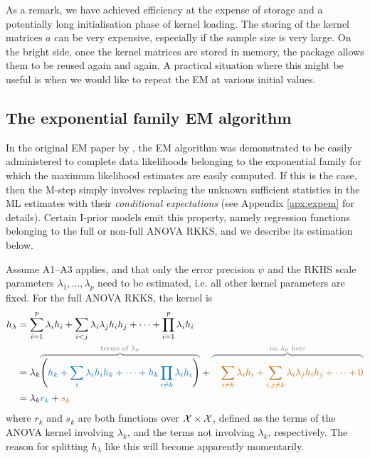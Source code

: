As a remark, we have achieved efficiency at the expense of storage and a potentially long initialisation phase of kernel loading.
The storing of the kernel matrices $a$ can be very expensive, especially if the sample size is very large.
On the bright side, once the kernel matrices are stored in memory, the  package allows them to be reused again and again.
A practical situation where this might be useful is when we would like to repeat the EM at various initial values.

\subsection{The exponential family EM algorithm}

In the original EM paper by \citet{dempster1977maximum}, the EM algorithm was demonstrated to be easily administered to complete data likelihoods belonging to the exponential family for which the maximum likelihood estimates are easily computed.
If this is the case, then the M-step simply involves replacing the unknown sufficient statistics in the ML estimates with their \emph{conditional expectations} (see Appendix \ref{apx:expem} for details).
Certain I-prior models emit this property, namely regression functions belonging to the full or non-full ANOVA RKKS, and we describe its estimation below.

Assume A1--A3 applies, and that only the error precision $\psi$ and the RKHS scale parameters $\lambda_1,\dots,\lambda_p$ need to be estimated, i.e. all other kernel parameters are fixed.
For the full ANOVA RKKS, the kernel is
\begin{align*}
  h_\lambda 
  &= \sum_{i=1}^p \lambda_i h_i + \sum_{i<j} \lambda_i \lambda_j h_i h_j + \cdots + \prod_{i=1}^p \lambda_i h_i \\
  &= \lambda_k 
  \myoverbrace{
  \Bigg(  
  {\color{colblu} h_k + \sum_{i} \lambda_i h_i h_k + \cdots + h_k \prod_{i\neq k} \lambda_i h_i}
  \Bigg)
  }{\text{terms of $\lambda_k$}} 
  + 
  \myoverbrace{\color{colred}
  \phantom{\Bigg(}
  \sum_{i\neq k} \lambda_i h_i + \sum_{i,j \neq k} \lambda_i \lambda_j h_i h_j + \cdots + 0
  }{\text{no $\lambda_k$ here}} \\
  &= \lambda_k {\color{colblu}r_k} + {\color{colred}s_k}
\end{align*}
where $r_k$ and $s_k$ are both functions over ${\mathcal X}\times{\mathcal X}$, defined as the terms of the ANOVA kernel involving $\lambda_k$, and the terms not involving $\lambda_k$, respectively.
The reason for splitting $h_\lambda$ like this will become apparently momentarily.

